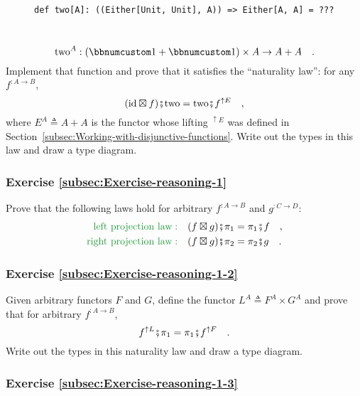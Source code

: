 \begin{wrapfigure}{L}{0.63\columnwidth}%
\vspace{-0.85\baselineskip}
\begin{lstlisting}
def two[A]: ((Either[Unit, Unit], A)) => Either[A, A] = ???
\end{lstlisting}

\vspace{-0.25\baselineskip}
\end{wrapfigure}%

~\vspace{-1.15\baselineskip}
\[
\text{two}^{A}:(\bbnum 1+\bbnum 1)\times A\rightarrow A+A\quad.
\]
\vspace{-0.35\baselineskip}
Implement that function and prove that it satisfies the \textsf{``}naturality
law\textsf{''}: for any $f^{:A\rightarrow B}$,
\[
(\text{id}\boxtimes f)\bef\text{two}=\text{two}\bef f^{\uparrow E}\quad,
\]
where $E^{A}\triangleq A+A$ is the functor whose lifting $^{\uparrow E}$
was defined in Section~\ref{subsec:Working-with-disjunctive-functions}.
Write out the types in this law and draw a type diagram. 

\subsubsection{Exercise \label{subsec:Exercise-reasoning-1}\ref{subsec:Exercise-reasoning-1}}

Prove that the following laws hold for arbitrary $f^{:A\rightarrow B}$
and $g^{:C\rightarrow D}$:
\begin{align*}
{\color{greenunder}\text{left projection law}:}\quad & (f\boxtimes g)\bef\pi_{1}=\pi_{1}\bef f\quad,\\
{\color{greenunder}\text{right projection law}:}\quad & (f\boxtimes g)\bef\pi_{2}=\pi_{2}\bef g\quad.
\end{align*}


\subsubsection{Exercise \label{subsec:Exercise-reasoning-1-2}\ref{subsec:Exercise-reasoning-1-2}}

Given arbitrary functors $F$ and $G$, define the functor $L^{A}\triangleq F^{A}\times G^{A}$
and prove that for arbitrary $f^{:A\rightarrow B}$,
\[
f^{\uparrow L}\bef\pi_{1}=\pi_{1}\bef f^{\uparrow F}\quad.
\]
Write out the types in this naturality law and draw a type diagram. 

\subsubsection{Exercise \label{subsec:Exercise-reasoning-1-3}\ref{subsec:Exercise-reasoning-1-3}}

